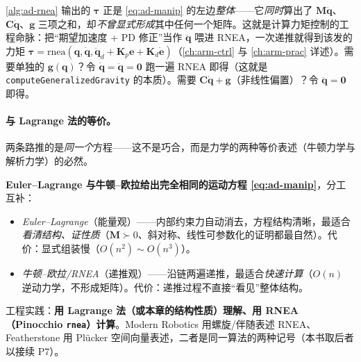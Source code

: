 \begin{insight}[一次 RNEA = 整条逆动力学 $\mathbf{M}\ddot{\mathbf{q}}+\mathbf{C}\dot{\mathbf{q}}+\mathbf{g}$]
\label{ins:ad-rnea-onepass}
\cref{alg:ad-rnea} 输出的 $\boldsymbol{\tau}$ 正是 \cref{eq:ad-manip} 的左边\emph{整体}——它\emph{同时}算出了 $\mathbf{M}\ddot{\mathbf{q}}$、$\mathbf{C}\dot{\mathbf{q}}$、$\mathbf{g}$ 三项之和，却\emph{不曾显式形成}其中任何一个矩阵。这就是计算力矩控制的工程命脉：把“期望加速度 + PD 修正”当作 $\ddot{\mathbf{q}}$ 喂进 RNEA，一次递推就得到该发的力矩 $\boldsymbol{\tau}=\mathrm{rnea}(\mathbf{q},\dot{\mathbf{q}},\ddot{\mathbf{q}}_d+\mathbf{K}_p\mathbf{e}+\mathbf{K}_d\dot{\mathbf{e}})$（\cref{ch:arm-ctrl} 与 \cref{ch:arm-prac} 详述）。需要单独的 $\mathbf{g}(\mathbf{q})$？令 $\dot{\mathbf{q}}=\ddot{\mathbf{q}}=\mathbf{0}$ 跑一遍 RNEA 即得（这就是 \texttt{computeGeneralizedGravity} 的本质）。需要 $\mathbf{C}\dot{\mathbf{q}}+\mathbf{g}$（非线性偏置）？令 $\ddot{\mathbf{q}}=\mathbf{0}$ 即得。
\end{insight}

\paragraph{与 Lagrange 法的等价。}
两条路推的是\emph{同一个}方程——这不是巧合，而是力学的两种等价表述（牛顿力学与解析力学）的必然。

\begin{insight}
\label{ins:ad-equiv}
\textbf{Euler--Lagrange 与牛顿--欧拉给出完全相同的运动方程 \cref{eq:ad-manip}}，分工互补：
\begin{itemize}
  \item \emph{Euler--Lagrange}（能量观）——内部约束力自动消去，方程结构清晰，最适合\emph{看清结构、证性质}（$\mathbf{M}\succ0$、斜对称、线性可参数化的证明都最自然）。代价：显式组装慢（$O(n^2)\sim O(n^3)$）。
  \item \emph{牛顿--欧拉/RNEA}（递推观）——沿链两遍递推，最适合\emph{快速计算}（$O(n)$ 逆动力学，不形成矩阵）。代价：递推过程不直接“看见”整体结构。
\end{itemize}
工程实践：\textbf{用 Lagrange 法（或本章的结构性质）理解、用 RNEA（Pinocchio \texttt{rnea}）计算}。Modern Robotics \cite{lynch2017modern} 用螺旋/伴随表述 RNEA、Featherstone \cite{featherstone2008rbda} 用 Plücker 空间向量表述，二者是同一算法的两种记号（本书取后者以接续 P7）。
\end{insight}

